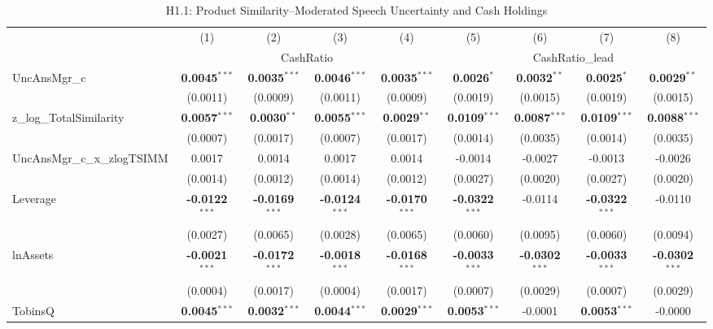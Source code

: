 \begin{landscape}
\begin{table}[H]
\setlength{\tabcolsep}{3pt}
\renewcommand{\arraystretch}{0.85}
\centering
\caption{H1.1: Product Similarity--Moderated Speech Uncertainty and Cash Holdings}
\label{tab:h1_1}
\scriptsize
\begin{tabular}{lcccccccc}
\toprule
 & (1) & (2) & (3) & (4) & (5) & (6) & (7) & (8) \\
 & \multicolumn{4}{c}{CashRatio} & \multicolumn{4}{c}{CashRatio\_lead} \\
\cmidrule(lr){2-5} \cmidrule(lr){6-9}
\midrule
UncAnsMgr\_c & \textbf{0.0045}$^{***}$ & \textbf{0.0035}$^{***}$ & \textbf{0.0046}$^{***}$ & \textbf{0.0035}$^{***}$ & \textbf{0.0026}$^{*}$ & \textbf{0.0032}$^{**}$ & \textbf{0.0025}$^{*}$ & \textbf{0.0029}$^{**}$ \\
 & (0.0011) & (0.0009) & (0.0011) & (0.0009) & (0.0019) & (0.0015) & (0.0019) & (0.0015) \\
z\_log\_TotalSimilarity & \textbf{0.0057}$^{***}$ & \textbf{0.0030}$^{**}$ & \textbf{0.0055}$^{***}$ & \textbf{0.0029}$^{**}$ & \textbf{0.0109}$^{***}$ & \textbf{0.0087}$^{***}$ & \textbf{0.0109}$^{***}$ & \textbf{0.0088}$^{***}$ \\
 & (0.0007) & (0.0017) & (0.0007) & (0.0017) & (0.0014) & (0.0035) & (0.0014) & (0.0035) \\
UncAnsMgr\_c\_x\_zlogTSIMM & 0.0017 & 0.0014 & 0.0017 & 0.0014 & -0.0014 & -0.0027 & -0.0013 & -0.0026 \\
 & (0.0014) & (0.0012) & (0.0014) & (0.0012) & (0.0027) & (0.0020) & (0.0027) & (0.0020) \\
\midrule
Leverage & \textbf{-0.0122}$^{***}$ & \textbf{-0.0169}$^{***}$ & \textbf{-0.0124}$^{***}$ & \textbf{-0.0170}$^{***}$ & \textbf{-0.0322}$^{***}$ & -0.0114 & \textbf{-0.0322}$^{***}$ & -0.0110 \\
 & (0.0027) & (0.0065) & (0.0028) & (0.0065) & (0.0060) & (0.0095) & (0.0060) & (0.0094) \\
lnAssets & \textbf{-0.0021}$^{***}$ & \textbf{-0.0172}$^{***}$ & \textbf{-0.0018}$^{***}$ & \textbf{-0.0168}$^{***}$ & \textbf{-0.0033}$^{***}$ & \textbf{-0.0302}$^{***}$ & \textbf{-0.0033}$^{***}$ & \textbf{-0.0302}$^{***}$ \\
 & (0.0004) & (0.0017) & (0.0004) & (0.0017) & (0.0007) & (0.0029) & (0.0007) & (0.0029) \\
TobinsQ & \textbf{0.0045}$^{***}$ & \textbf{0.0032}$^{***}$ & \textbf{0.0044}$^{***}$ & \textbf{0.0029}$^{***}$ & \textbf{0.0053}$^{***}$ & -0.0001 & \textbf{0.0053}$^{***}$ & -0.0000 \\

\end{tabular}
\end{table}
\end{landscape}
